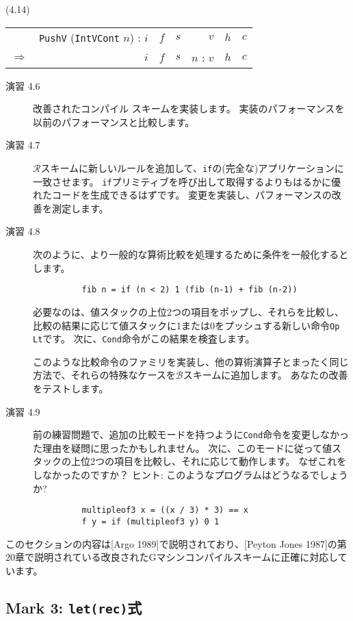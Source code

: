 \documentclass{jarticle}
\begin{document}
(4.14) \\
\begin{tabular} {|l r l r r l l|} \hline
	                  & \texttt{PushV} (\texttt{IntVCont} $n$) : $i$ & $f$ & $s$ & $v$       & $h$ & $c$ \\
	$\Longrightarrow$ & $i$                                          & $f$ & $s$ & $n$ : $v$ & $h$ & $c$ \\ \hline
\end{tabular}

\begin{description}
	\item[演習 4.6] 改善されたコンパイル スキームを実装します。
		実装のパフォーマンスを以前のパフォーマンスと比較します。
	\item[演習 4.7] $\mathcal{R}$スキームに新しいルールを追加して、\texttt{if}の(完全な)アプリケーションに一致させます。
		\texttt{if}プリミティブを呼び出して取得するよりもはるかに優れたコードを生成できるはずです。
		変更を実装し、パフォーマンスの改善を測定します。
	\item[演習 4.8] 次のように、より一般的な算術比較を処理するために条件を一般化するとします。
		\begin{verbatim}
          fib n = if (n < 2) 1 (fib (n-1) + fib (n-2))
        \end{verbatim}
		必要なのは、値スタックの上位2つの項目をポップし、それらを比較し、比較の結果に応じて値スタックに1または0をプッシュする新しい命令\texttt{Op Lt}です。
		次に、\texttt{Cond}命令がこの結果を検査します。

		このような比較命令のファミリを実装し、他の算術演算子とまったく同じ方法で、それらの特殊なケースを$\mathcal{B}$スキームに追加します。
		あなたの改善をテストします。
	\item[演習 4.9] 前の練習問題で、追加の比較モードを持つように\texttt{Cond}命令を変更しなかった理由を疑問に思ったかもしれません。
		次に、このモードに従って値スタックの上位2つの項目を比較し、それに応じて動作します。
		なぜこれをしなかったのですか？
		ヒント: このようなプログラムはどうなるでしょうか?
		\begin{verbatim}
          multipleof3 x = ((x / 3) * 3) == x
          f y = if (multipleof3 y) 0 1
        \end{verbatim}
\end{description}
このセクションの内容は[Argo 1989]で説明されており、[Peyton Jones 1987]の第20章で説明されている改良されたGマシンコンパイルスキームに正確に対応しています。
\newpage

\subsection{Mark 3: \texttt{let(rec)}式}
\end{document}
